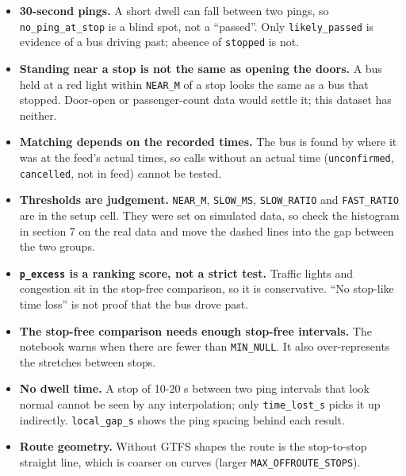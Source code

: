 \documentclass[11pt]{article}
\begin{document}
\begin{itemize}
\item
  \textbf{30-second pings.} A short dwell can fall between two pings, so
  \texttt{no\_ping\_at\_stop} is a blind spot, not a ``passed''. Only
  \texttt{likely\_passed} is evidence of a bus driving past; absence of
  \texttt{stopped} is not.
\item
  \textbf{Standing near a stop is not the same as opening the doors.} A
  bus held at a red light within \texttt{NEAR\_M} of a stop looks the
  same as a bus that stopped. Door-open or passenger-count data would
  settle it; this dataset has neither.
\item
  \textbf{Matching depends on the recorded times.} The bus is found by
  where it was at the feed's actual times, so calls without an actual
  time (\texttt{unconfirmed}, \texttt{cancelled}, not in feed) cannot be
  tested.
\item
  \textbf{Thresholds are judgement.} \texttt{NEAR\_M},
  \texttt{SLOW\_MS}, \texttt{SLOW\_RATIO} and \texttt{FAST\_RATIO} are
  in the setup cell. They were set on simulated data, so check the
  histogram in section 7 on the real data and move the dashed lines into
  the gap between the two groups.
\item
  \textbf{\texttt{p\_excess} is a ranking score, not a strict test.}
  Traffic lights and congestion sit in the stop-free comparison, so it
  is conservative. ``No stop-like time loss'' is not proof that the bus
  drove past.
\item
  \textbf{The stop-free comparison needs enough stop-free intervals.}
  The notebook warns when there are fewer than \texttt{MIN\_NULL}. It
  also over-represents the stretches between stops.
\item
  \textbf{No dwell time.} A stop of 10-20 s between two ping intervals
  that look normal cannot be seen by any interpolation; only
  \texttt{time\_lost\_s} picks it up indirectly. \texttt{local\_gap\_s}
  shows the ping spacing behind each result.
\item
  \textbf{Route geometry.} Without GTFS shapes the route is the
  stop-to-stop straight line, which is coarser on curves (larger
  \texttt{MAX\_OFFROUTE\_STOPS}).
\end{itemize}


    
    
    
\end{document}

